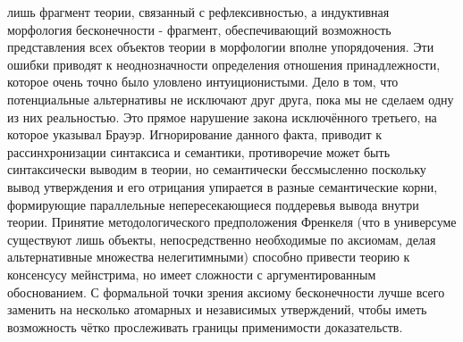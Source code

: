 \documentclass[12pt]{article}
\begin{document}
лишь фрагмент теории, связанный с рефлексивностью, а индуктивная морфология бесконечности - фрагмент, обеспечивающий возможность представления всех объектов теории в морфологии вполне упорядочения. Эти ошибки приводят к неоднозначности определения отношения принадлежности, которое очень точно было уловлено интуиционистыми. Дело в том, что потенциальные альтернативы не исключают друг друга, пока мы не сделаем одну из них реальностью. Это прямое нарушение закона исключённого третьего, на которое указывал Брауэр. Игнорирование данного факта, приводит к рассинхронизации синтаксиса и семантики, противоречие может быть синтаксически выводим в теории, но семантически бессмысленно поскольку вывод утверждения и его отрицания упирается в разные семантические корни, формирующие параллельные непересекающиеся поддеревья вывода внутри теории. Принятие методологического предположения Френкеля (что в универсуме существуют лишь объекты, непосредственно необходимые по аксиомам, делая альтернативные множества нелегитимными) способно привести теорию к консенсусу мейнстрима, но имеет сложности с аргументированным обоснованием. С формальной точки зрения аксиому бесконечности лучше всего заменить на несколько атомарных и независимых утверждений, чтобы иметь возможность чётко прослеживать границы применимости доказательств.
\end{document}
